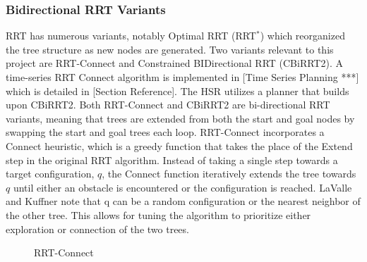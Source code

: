 \documentclass[12pt]{article}
\begin{document}
        \subsubsection{Bidirectional RRT Variants}
            RRT has numerous variants, notably Optimal RRT (RRT\(^*\)) which reorganized the tree structure as new nodes are generated. Two variants relevant to this project are RRT-Connect and Constrained BIDirectional RRT (CBiRRT2). A time-series RRT Connect algorithm is implemented in [Time Series Planning ***] which is detailed in [Section Reference]. The HSR utilizes a planner that builds upon CBiRRT2. Both RRT-Connect and CBiRRT2 are bi-directional RRT variants, meaning that trees are extended from both the start and goal nodes by swapping the start and goal trees each loop. RRT-Connect incorporates a Connect heuristic, which is a greedy function that takes the place of the Extend step in the original RRT algorithm. Instead of taking a single step towards a target configuration, \(q\), the Connect function iteratively extends the tree towards \(q\) until either an obstacle is encountered or the configuration is reached. LaValle and Kuffner note that q can be a random configuration or the nearest neighbor of the other tree. This allows for tuning the algorithm to prioritize either exploration or connection of the two trees.
            \begin{figure}[ht]
                \quad
                \caption{RRT-Connect}
                \label{fig:rrt-connect}
            \end{figure}
\end{document}

